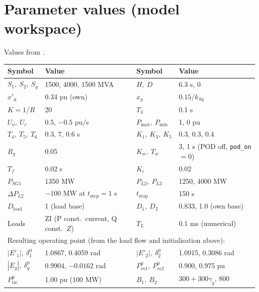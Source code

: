 \documentclass[11pt,a4paper]{article}
\numberwithin{equation}{section}
\begin{document}
\section*{Parameter values (model workspace)}
%
\noindent Values from \cite[Tables~2, 5--7]{RA2021access}.
\begin{center}
\small
\begin{tabular}{llll}
\toprule
Symbol & Value & Symbol & Value\\
\midrule
$S_1,\ S_2,\ S_g$ & 1500, 4000, 1500 MVA & $H,\ D$ & 6.3 s, 0\\
$x'_d$ & 0.34 pu (own) & $x_g$ & $0.15/k_{Sg}$\\
$K=1/R$ & 20 & $T_3$ & 0.1 s\\
$U_o,\ U_c$ & 0.5, $-0.5$ pu/s & $P_{\max},\ P_{\min}$ & 1, 0 pu\\
$T_4,\ T_5,\ T_6$ & 0.3, 7, 0.6 s & $K_1,\ K_3,\ K_5$ & 0.3, 0.3, 0.4\\
$R_g$ & 0.05 & $K_w,\ T_w$ & 3, 1 s (POD off, \texttt{pod\_on} $=0$)\\
$T_f$ & 0.02 s & $K_i$ & 0.02\\
$P_{SG1}$ & 1350 MW & $P_{L2},\ P_{L3}$ & 1250, 4000 MW\\
$\Delta P_{L2}$ & $-100$ MW at $t_{\text{step}}=1$ s & $t_{\text{stop}}$ & 150 s\\
$D_{\text{load}}$ & 1 (load base) & $D_1,\ D_2$ & 0.833, 1.0 (own base)\\
Loads & ZI (P const.\ current, Q const.\ $Z$) & $T_L$ & 0.1 ms (numerical)\\
\midrule
\multicolumn{4}{l}{Resulting operating point (from the load flow and initialisation above):}\\
$|E'_1|,\ \delta_1^0$ & 1.0867, 0.4059 rad & $|E'_2|,\ \delta_2^0$ & 1.0915, 0.3086 rad\\
$|E_g|,\ \delta_g^0$ & 0.9904, $-0.0162$ rad & $P_{m1}^0,\ P_{m2}^0$ & 0.900, 0.975 pu\\
$P_{\text{tie}}^0$ & 1.00 pu (100 MW) & $B_1,\ B_2$ & $300+300\gamma_g$, 800\\
\bottomrule
\end{tabular}
\end{center}
\end{document}
